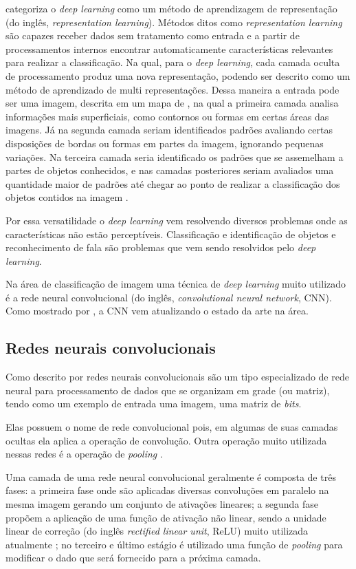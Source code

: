 \par {} categoriza o \textit{deep learning} como um método de aprendizagem de representação (do inglês, \textit{representation learning}). Métodos ditos como \textit{representation learning} são capazes receber dados sem tratamento como entrada e a partir de processamentos internos encontrar automaticamente características relevantes para realizar a classificação. Na qual, para o \textit{deep learning}, cada camada oculta de processamento produz uma nova representação, podendo ser descrito como um método de aprendizado de multi representações. Dessa maneira a entrada pode ser uma imagem, descrita em um mapa de , na qual a primeira camada analisa informações mais superficiais, como contornos ou formas em certas áreas das imagens. Já na segunda camada seriam identificados padrões avaliando certas disposições de bordas ou formas em partes da imagem, ignorando pequenas variações. Na terceira camada seria identificado os padrões que se assemelham a partes de objetos conhecidos, e nas camadas posteriores seriam avaliados uma quantidade maior de padrões até chegar ao ponto de realizar a classificação dos objetos contidos na imagem \cite{lecun2015deep}.

\par Por essa versatilidade o \textit{deep learning} vem resolvendo diversos problemas onde as características não estão perceptíveis. Classificação e identificação de objetos \cite{farabet2013learning} e reconhecimento de fala \cite{hinton2012deep} são problemas que vem sendo resolvidos pelo \textit{deep learning}.
\par Na área de classificação de imagem uma técnica de \textit{deep learning} muito utilizado é a rede neural convolucional (do inglês, \textit{convolutional neural network}, CNN). Como mostrado por , a CNN vem atualizando o estado da arte na área.

\subsection{Redes neurais convolucionais}
Como descrito por  redes neurais convolucionais são um tipo especializado de rede neural para processamento de dados que se organizam em grade (ou matriz), tendo como um exemplo de entrada uma imagem, uma matriz de \textit{bits}.
\par Elas possuem o nome de rede convolucional pois, em algumas de suas camadas ocultas ela aplica a operação de convolução. Outra operação muito utilizada nessas redes é a operação de \textit{pooling} \cite{Goodfellow-et-al-2016}.
\par Uma camada de uma rede neural convolucional geralmente é composta de três fases: a primeira fase onde são aplicadas diversas convoluções em paralelo na mesma imagem gerando um conjunto de ativações lineares; a segunda fase propõem a aplicação de uma função de ativação não linear, sendo a unidade linear de correção (do inglês \textit{rectified linear unit}, ReLU) muito utilizada atualmente \cite{lecun2015deep}; no terceiro e último estágio é utilizado uma função de \textit{pooling} para modificar o dado que será fornecido para a próxima camada.    


